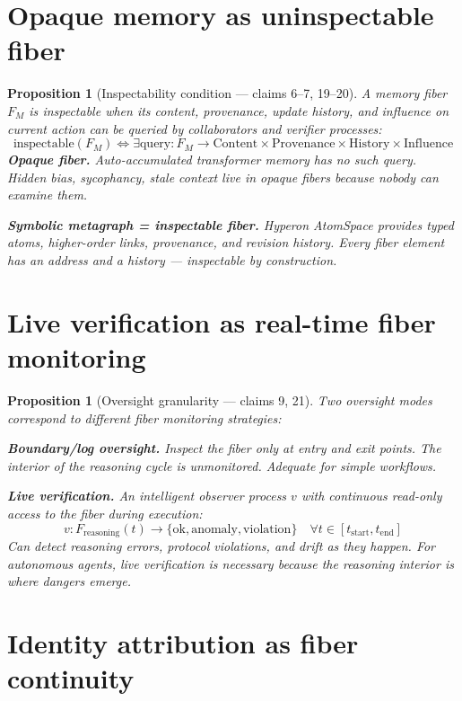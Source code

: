 \documentclass[11pt,a4paper]{article}
\newtheorem{proposition}[definition]{Proposition}
\begin{document}
\section{Opaque memory as uninspectable fiber}

\begin{proposition}[Inspectability condition --- claims 6--7, 19--20]
\label{prop:memory}
A memory fiber $F_M$ is \emph{inspectable} when its content,
provenance, update history, and influence on current action can be
queried by collaborators and verifier processes:
\[
  \text{inspectable}(F_M) \iff \exists \text{query}: F_M \to
    \text{Content} \times \text{Provenance} \times \text{History}
    \times \text{Influence}
\]
\textbf{Opaque fiber.} Auto-accumulated transformer memory has no
such query. Hidden bias, sycophancy, stale context live in opaque
fibers because nobody can examine them.

\textbf{Symbolic metagraph = inspectable fiber.} Hyperon AtomSpace
provides typed atoms, higher-order links, provenance, and revision
history. Every fiber element has an address and a history ---
inspectable by construction.
\end{proposition}

\section{Live verification as real-time fiber monitoring}

\begin{proposition}[Oversight granularity --- claims 9, 21]
\label{prop:oversight}
Two oversight modes correspond to different fiber monitoring strategies:

\textbf{Boundary/log oversight.} Inspect the fiber only at entry
and exit points. The interior of the reasoning cycle is unmonitored.
Adequate for simple workflows.

\textbf{Live verification.} An intelligent observer process $v$
with continuous read-only access to the fiber during execution:
\[
  v: F_{\text{reasoning}}(t) \to \{\text{ok}, \text{anomaly},
    \text{violation}\} \quad \forall t \in [t_{\text{start}},
    t_{\text{end}}]
\]
Can detect reasoning errors, protocol violations, and drift as
they happen. For autonomous agents, live verification is necessary
because the reasoning interior is where dangers emerge.
\end{proposition}

\section{Identity attribution as fiber continuity}
\end{document}
